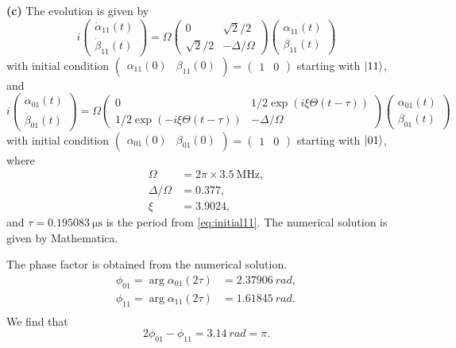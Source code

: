 \documentclass{article}
\makeatletter
\newcommand*{\shifttext}[1]{%
  \settowidth{\@tempdima}{#1}%
  \hspace{-\@tempdima}#1%
}
\newcommand{\plabel}[1]{%
\shifttext{\textbf{#1}\quad}%
}
\makeatother
\begin{document}
\plabel{(c)}%
The evolution is given by
\begin{equation}
    \label{eq:initial11}
    i\begin{pmatrix}
        \dot{\alpha}_{11}(t) \\ \dot{\beta}_{11}(t)
    \end{pmatrix} = \Omega \begin{pmatrix}
        0 & \sqrt{2}/2 \\ \sqrt{2}/2 & -\Delta/\Omega
    \end{pmatrix} \begin{pmatrix}
        \alpha_{11}(t) \\ \beta_{11}(t)
    \end{pmatrix}
\end{equation}
with initial condition $\begin{pmatrix}
    \alpha_{11}(0) & \beta_{11}(0)
\end{pmatrix} = \begin{pmatrix}
    1 & 0
\end{pmatrix}$ starting with $\ket{11}$, and
\[ i\begin{pmatrix}
    \dot{\alpha}_{01}(t) \\ \dot{\beta}_{01}(t)
\end{pmatrix} = \Omega \begin{pmatrix}
    0 & 1/2 \exp(i\xi\Theta(t - \tau)) \\ 1/2\exp(-i\xi\Theta(t - \tau)) & -\Delta/\Omega
\end{pmatrix} \begin{pmatrix}
    \alpha_{01}(t) \\ \beta_{01}(t)
\end{pmatrix} \]
with initial condition $\begin{pmatrix}
    \alpha_{01}(0) & \beta_{01}(0)
\end{pmatrix} = \begin{pmatrix}
    1 & 0
\end{pmatrix}$ starting with $\ket{01}$,
where
\begin{align*}
    \Omega &= 2\pi\times \SI{3.5}{\mega\hertz}, \\
    \Delta/\Omega &= \num{0.377}, \\
    \xi &= \num{3.9024},
\end{align*}
and $\tau = \SI{0.195083}{\micro\second}$ is the period from \eqref{eq:initial11}.
The numerical solution is given by Mathematica.
\par
The phase factor is obtained from the numerical solution.
\begin{align*}
    \phi_{01} = \arg \alpha_{01}(2\tau) &= \SI{2.37906}{rad}, \\
    \phi_{11} = \arg \alpha_{11}(2\tau) &= \SI{1.61845}{rad}. \\
\end{align*}
We find that
\[ 2\phi_{01} - \phi_{11} = \SI{3.14}{rad} = \pi. \]
\end{document}
